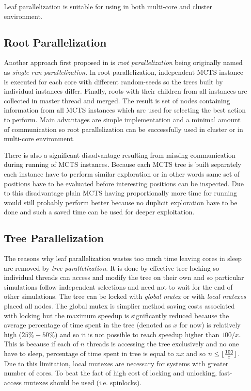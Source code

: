 Leaf parallelization is suitable for using in both multi-core and cluster environment.


\subsection{Root Parallelization}


Another approach first proposed in \cite{Cazenave2007} is \emph{root parallelization} being
originally named as \emph{single-run parallelization}. In root parallelization, independent
MCTS instance is executed for each core with different random-seeds so the trees built by individual
instances differ. Finally, roots with their children from all instances are collected in master
thread and merged. The result is set of nodes containing information from all MCTS instances which
are used for selecting the best action to perform. Main advantages are simple implementation and a
minimal amount of communication so root parallelization can be successfully used in cluster
or in multi-core environment.

There is also a significant disadvantage resulting from missing communication during running of MCTS
instances. Because each MCTS tree is built separately each instance have to perform similar
exploration or in other words same set of positions have to be evaluated before interesting
positions can be inspected. Due to this disadvantage plain MCTS having proportionally more time for
running would still probably perform better because no duplicit exploration have to be done and such
a saved time can be used for deeper exploitation.

\subsection{Tree Parallelization}


The reasons why leaf parallelization wastes too much time leaving cores in sleep are removed by
\emph{tree parallelization}. It is done by effective tree locking so individual threads can access
and modify the tree on their own and so particular simulations follow independent selections and
need not to wait for the end of other simulations. The tree can be locked with \emph{global mutex}
or with \emph{local mutexes} placed all nodes. The global mutex is simplier method saving costs
associated with locking but the maximum speedup is significantly reduced because the average
percentage of time spent in the tree (denoted as $x$ for now) is relatively high ($25\%-50\%$) and
so it is not possible to reach speedup higher than $100/x$. This is because if each of $n$
threads is
accessing the tree exclusively and no one have to sleep, percentage of time spent in 
tree is
equal to $n x$ and so $n \le \lfloor {100 \over{x}} \rfloor$. Due to this limitation, local mutexes
are necessary for systems with greater number of cores. To beat the fact of high cost of locking and
unlocking, fast-access mutexes should be used (i.e. spinlocks).

